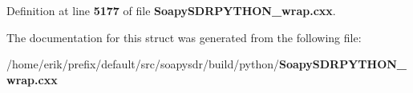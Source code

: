 Definition at line {\bf 5177} of file {\bf Soapy\+S\+D\+R\+P\+Y\+T\+H\+O\+N\+\_\+wrap.\+cxx}.



The documentation for this struct was generated from the following file\+:\begin{DoxyCompactItemize}
\item 
/home/erik/prefix/default/src/soapysdr/build/python/{\bf Soapy\+S\+D\+R\+P\+Y\+T\+H\+O\+N\+\_\+wrap.\+cxx}\end{DoxyCompactItemize}
